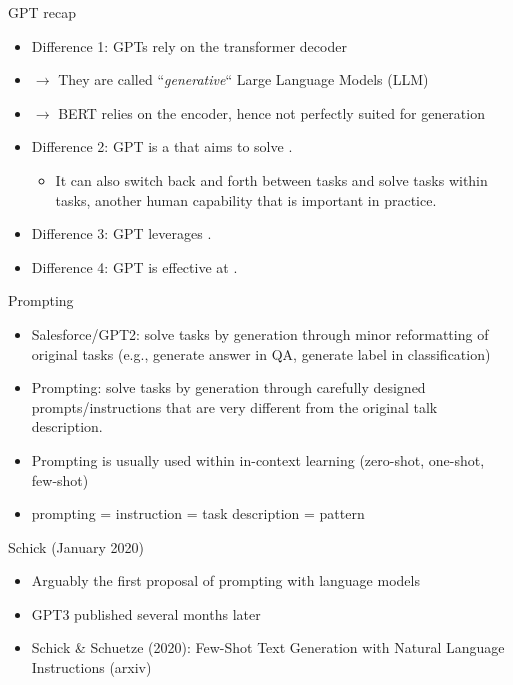 \begin{frame}{GPT recap}

\vfill

  \begin{itemize}
\item Difference 1: GPTs rely on the transformer decoder
\item[] $\to$ They are called ``\textit{generative}`` Large Language Models (LLM)
\item[] $\to$ BERT relies on the encoder, hence not perfectly suited for generation
\item Difference 2: GPT is a  that aims to solve .  
  \begin{itemize}
    \item It can also switch back and forth between tasks and solve
    tasks within tasks, another human capability that is
    important in practice. 
    \end{itemize}
\item Difference 3: GPT leverages .
\item Difference 4: GPT is effective at .
    \end{itemize}

\vfill

\end{frame}

\begin{frame}{Prompting}

\vfill

  \begin{itemize}
\item Salesforce/GPT2: solve tasks by generation through
minor reformatting of original tasks (e.g., generate answer
in QA, generate label in classification)
\item Prompting: solve tasks by generation through carefully
designed prompts/instructions that are very different
from the original talk description.
\item Prompting is usually used within in-context learning
(zero-shot, one-shot, few-shot)
\item prompting = instruction = task description = pattern
    \end{itemize}

\vfill

\end{frame}

\begin{frame}{Schick (January 2020)}

\vfill

  \begin{itemize}
\item Arguably the first proposal of prompting with
language models
\item GPT3 published several months later
\item Schick \& Schuetze (2020):
Few-Shot Text Generation with Natural Language Instructions (arxiv)
    \end{itemize}

\vfill

\end{frame}

